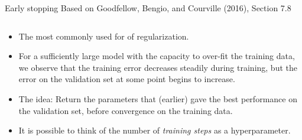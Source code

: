 \documentclass[
  10pt,
  ignorenonframetext,
]{beamer}
\providecommand{\tightlist}{%
  \setlength{\itemsep}{0pt}\setlength{\parskip}{0pt}}
\begin{document}
\begin{frame}
\begin{block}{Early stopping}
\protect\hypertarget{early-stopping}{}
\tiny Based on Goodfellow, Bengio, and Courville (2016), Section 7.8

\normalsize

\(~\)

\begin{itemize}
\tightlist
\item
  The most commonly used for of regularization.
\end{itemize}

\vspace{2mm}

\begin{itemize}
\tightlist
\item
  For a sufficiently large model with the capacity to over-fit the
  training data, we observe that the training error decreases steadily
  during training, but the error on the validation set at some point
  begins to increase.
\end{itemize}

\vspace{2mm}

\begin{itemize}
\tightlist
\item
  The idea: Return the parameters that (earlier) gave the best
  performance on the validation set, before convergence on the training
  data.
\end{itemize}

\vspace{2mm}

\begin{itemize}
\tightlist
\item
  It is possible to think of the number of \emph{training steps} as a
  hyperparameter.
\end{itemize}
\end{block}
\end{frame}
\end{document}

